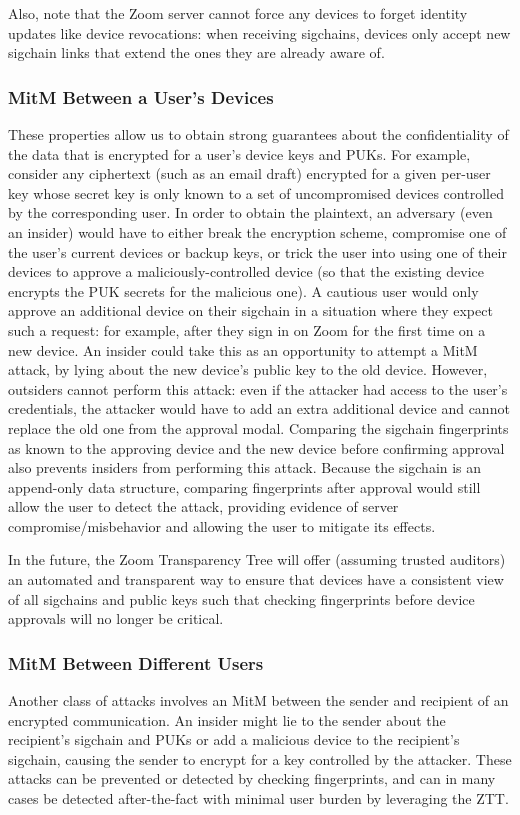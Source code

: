 Also, note that the Zoom server cannot force any devices to forget identity updates like device
revocations: when receiving sigchains, devices only accept new sigchain links that extend the ones
they are already aware of.

\subsubsection{MitM Between a User's Devices}
These properties allow us to obtain strong guarantees about the confidentiality of the data that is
encrypted for a user's device keys and PUKs. For example, consider any ciphertext (such as an email
draft) encrypted for a given per-user key whose secret key is only known to a set of uncompromised
devices controlled by the corresponding user. In order to obtain the plaintext, an adversary (even
an insider) would have to either break the encryption scheme, compromise one of the user's current
devices or backup keys, or trick the user into using one of their devices to
approve a maliciously-controlled device (so that the existing device encrypts
the PUK secrets for the malicious one). A cautious user would only approve an
additional device on their sigchain in a situation where they
expect such a request: for example, after they sign in on Zoom for the first time on a new device.
An insider could take this as an opportunity to attempt a MitM attack, by lying about the new
device's public key to the old device. However, outsiders cannot perform this attack: even if the
attacker had access to the user's credentials, the attacker would have to add an extra additional
device and cannot replace the old one from the approval modal. Comparing the sigchain fingerprints
as known to the approving device and the new device before confirming approval also prevents
insiders from performing this attack. Because the sigchain is an append-only data structure,
comparing fingerprints after approval would still allow the user to detect the attack, providing
evidence of server compromise/misbehavior and allowing the user to mitigate its effects.

In the future, the Zoom Transparency Tree will offer (assuming trusted auditors) an automated and transparent way to
ensure that devices have a consistent view of all sigchains and public keys such that checking
fingerprints before device approvals will no longer be critical.

\subsubsection{MitM Between Different Users}
Another class of attacks involves an MitM between the sender and recipient of an encrypted
communication. An insider might lie to the sender about the recipient's sigchain and PUKs or add a
malicious device to the recipient's sigchain, causing the sender to encrypt for a key controlled by
the attacker. These attacks can be prevented or detected by checking fingerprints, and can in many cases
be detected after-the-fact with minimal user burden by leveraging the ZTT.


